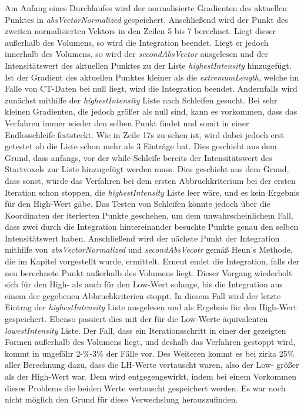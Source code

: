 Am Anfang eines Durchlaufes wird der normalisierte Gradienten des aktuellen Punktes in \textit{absVectorNormalized} gespeichert. Anschließend wird der Punkt des zweiten normalisierten Vektors in den Zeilen 5 bis 7 berechnet. Liegt dieser außerhalb des Volumens, so wird die Integration beendet. Liegt er jedoch innerhalb des Volumens, so wird der \textit{secondAbsVector} ausgelesen und der Intensitätswert des aktuellen Punktes zu der Liste \textit{highestIntensity} hinzugefügt. Ist der Gradient des aktuellen Punktes kleiner als die \textit{extremumLength}, welche im Falle von CT-Daten bei null liegt, wird die Integration beendet.
\newline
Andernfalls wird zunächst mithilfe der \textit{highestIntensity} Liste nach Schleifen gesucht. Bei sehr kleinen Gradienten, die jedoch größer als null sind, kann es vorkommen, dass das Verfahren immer wieder den selben Punkt findet und somit in einer Endlosschleife feststeckt.
Wie in Zeile 17s zu sehen ist, wird dabei jedoch erst getestet ob die Liste schon mehr als 3 Einträge hat. Dies geschieht aus dem Grund, dass anfangs, vor der while-Schleife bereits der Intensitätswert des Startvoxels zur Liste hinzugefügt werden muss. Dies geschieht aus dem Grund, dass sonst, würde das Verfahren bei dem ersten Abbruchkriterium bei der ersten Iteration schon stoppen, die \textit{highestIntensity} Liste leer wäre, und es kein Ergebnis für den High-Wert gäbe.
Das Testen von Schleifen könnte jedoch über die Koordinaten der iterierten Punkte geschehen, um dem unwahrscheinlichem Fall, dass zwei durch die Integration hintereinander besuchte Punkte genau den selben Intensitätswert haben.
Anschließend wird der nächste Punkt der Integration mithilfe von \textit{absVectorNormalized} und \textit{secondAbsVecotr} gemäß Heun's Methode, die im Kapitel  vorgestellt wurde, ermittelt. Erneut endet die Integration, falls der neu berechnete Punkt außerhalb des Volumens liegt.
\newline
Dieser Vorgang wiederholt sich für den High- als auch für den Low-Wert solange, bis die Integration aus einem der gegebenen Abbruchkriterien stoppt. In diesem Fall wird der letzte Eintrag der \textit{highestIntensity} Liste ausgelesen und als Ergebnis für den High-Wert gespeichert. Ebenso passiert dies mit der für die Low-Werte äquivalenten \textit{lowestIntensity} Liste.
Der Fall, dass ein Iterationsschritt in einer der gezeigten Formen außerhalb des Volumens liegt, und deshalb das Verfahren gestoppt wird, kommt in ungefähr 2-\%-3\% der Fälle vor. Des Weiteren kommt es bei zirka 25\% aller Berechnung dazu, dass die LH-Werte vertauscht waren, also der Low- größer als der High-Wert war. Dem wird entgegengewirkt, indem bei einem Vorkommen dieses Problems die beiden Werte vertauscht gespeichert werden. Es war noch nicht möglich den Grund für diese Verwechslung herauszufinden.




